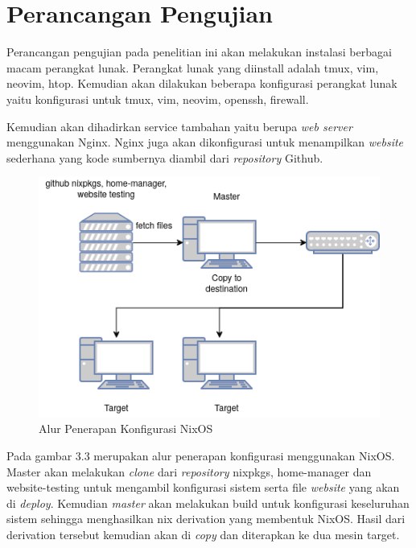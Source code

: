 \documentclass[10pt,]{report}
\begin{document}
\section{Perancangan Pengujian}
\begin{adjustwidth}{20pt}{}
	\hspace\parindent
	Perancangan pengujian pada penelitian ini akan melakukan instalasi berbagai
	macam perangkat lunak. Perangkat lunak yang diinstall adalah tmux, vim,
	neovim, htop. Kemudian akan dilakukan beberapa konfigurasi perangkat lunak
	yaitu konfigurasi untuk tmux, vim, neovim, openssh, firewall.

	Kemudian akan dihadirkan service tambahan yaitu berupa \textit{web server}
	menggunakan Nginx. Nginx juga akan dikonfigurasi untuk menampilkan
	\textit{website} sederhana yang kode sumbernya diambil dari
	\textit{repository} Github.
	\begin{figure}[H]
		\centering
		\includegraphics[width=\textwidth]{images/Topologi-NixOS.png}
		\caption{Alur Penerapan Konfigurasi NixOS}
	\end{figure}

	Pada gambar 3.3 merupakan alur penerapan konfigurasi menggunakan NixOS.
	Master akan melakukan \textit{clone} dari \textit{repository} nixpkgs,
	home-manager dan website-testing untuk mengambil konfigurasi sistem serta
	file \textit{website} yang akan di \textit{deploy}. Kemudian \textit{master}
	akan melakukan build untuk konfigurasi keseluruhan sistem sehingga
	menghasilkan nix derivation yang membentuk NixOS. Hasil dari derivation
	tersebut kemudian akan di \textit{copy} dan diterapkan ke dua mesin target.


\end{adjustwidth}
\end{document}
